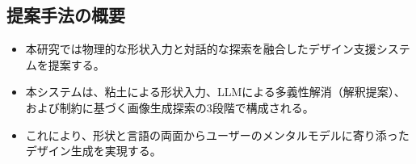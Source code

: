 \documentclass[dvipdfmx]{jlreq}
\begin{document}
\subsection{提案手法の概要}
\begin{itemize}
  \item 本研究では物理的な形状入力と対話的な探索を融合したデザイン支援システムを提案する。
  \item 本システムは、粘土による形状入力、LLMによる多義性解消（解釈提案）、および制約に基づく画像生成探索の3段階で構成される。
  \item これにより、形状と言語の両面からユーザーのメンタルモデルに寄り添ったデザイン生成を実現する。
\end{itemize}
\end{document}
